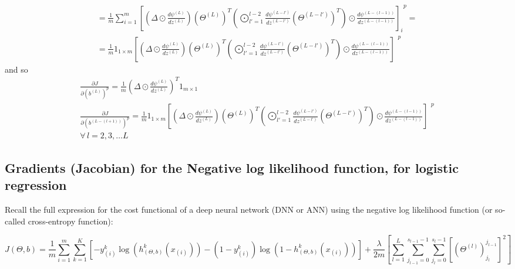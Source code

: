 \documentclass[10pt]{amsart}
\begin{document}
\begin{multicols*}{2}
\[\begin{gathered}
= \frac{1}{m} \sum_{i=1}^m \left[ (\Delta \odot \frac{d\psi^{(L)} }{ dz^{(L)} } )(\Theta^{(L)})^T \left( \bigodot^{l-2}_{ l'=1} \frac{d \psi^{(L-l')} }{ dz^{(L-l')}} (\Theta^{(L-l')})^T \right) \odot \frac{d\psi^{ (L-(l-1))} }{ dz^{(L-(l-1))}} \right]_i^{\  \  p }  = \\
= \frac{1}{m}  1_{1\times m } \left[ (\Delta \odot \frac{d\psi^{(L)} }{ dz^{(L)} } )(\Theta^{(L)})^T \left( \bigodot^{l-2}_{ l'=1} \frac{d \psi^{(L-l')} }{ dz^{(L-l')}} (\Theta^{(L-l')})^T \right) \odot \frac{d\psi^{ (L-(l-1))} }{ dz^{(L-(l-1))}} \right]^{\  \  p } 
\end{gathered}
\]
and so 
\begin{equation}\label{Eq:DNN_gradJ_L2norm_bs}
\boxed{ \begin{gathered}
	\frac{\partial J}{ \partial (b^{(L)})^p } = \frac{1}{m} ( \Delta \odot \frac{d\psi^{(L)}}{dz^{(L)}})^T 1_{m\times 1}   \\
	\frac{ \partial J }{ \partial (b^{(L-(l+1) )} )^p } =  \frac{1}{m}  1_{1\times m } \left[ (\Delta \odot \frac{d\psi^{(L)} }{ dz^{(L)} } )(\Theta^{(L)})^T \left( \bigodot^{l-2}_{ l'=1} \frac{d \psi^{(L-l')} }{ dz^{(L-l')}} (\Theta^{(L-l')})^T \right) \odot \frac{d\psi^{ (L-(l-1))} }{ dz^{(L-(l-1))}} \right]^{\  \  p } \\
	\forall \, l = 2,3, \dots L
	\end{gathered} }
\end{equation}



\subsection{Gradients (Jacobian) for the Negative log likelihood function, for logistic regression}

Recall the full expression for the cost functional of a deep neural network (DNN or ANN) using the negative log likelihood function (or so-called cross-entropy function):  

\begin{equation}
J(\Theta,b) = \frac{1}{m} \sum_{i=1}^m \sum_{k=1}^K \left[ -y^k_{(i)} \log{ (h^k_{(\Theta,b)}(x_{(i)}) )} - (1-y^k_{(i)}) \log{ (1-h^k_{(\Theta,b)}(x_{(i)}) )}  \right] +  \frac{\lambda}{2m} \left[ \sum_{l=1}^L \sum_{j_{l-1} =0}^{ s_{l-1} -1} \sum_{j_l =0}^{s_l - 1} \left[ ( \Theta^{ (l)} )_{j_l}^{j_{l-1}} \right]^2 \right]
\end{equation}


\end{multicols*}
\end{document}

